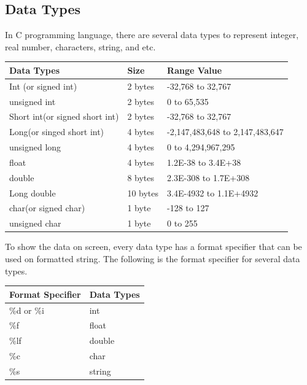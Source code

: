 \subsection{Data Types}
In C programming language, there are several data types to represent integer, real number, characters, string, and etc.
\begin{center}
	\begin{tabular}{|l|l|l|}
		\hline
		Data Types                       & Size   & Range Value                              \\ \hline
		Int (or signed int)            & 2 bytes  & -32,768 to 32,767                          \\ \hline
		unsigned int                   & 2 bytes  & 0 to 65,535                                \\ \hline
		Short int(or signed short int) & 2 bytes  & -32,768 to 32,767                          \\ \hline
		Long(or singed short int)      & 4 bytes  & -2,147,483,648 to 2,147,483,647            \\ \hline
		unsigned long                  & 4 bytes  & 0 to 4,294,967,295                         \\ \hline
		float                          & 4 bytes  & 1.2E-38 to 3.4E+38     						\\ \hline
		double                         & 8 bytes  & 2.3E-308 to 1.7E+308    					\\ \hline
		Long double                    & 10 bytes & 3.4E-4932 to 1.1E+4932 						 \\ \hline
		char(or signed char)           & 1 byte   & -128 to 127                                \\ \hline
		unsigned char                  & 1 byte   & 0 to 255                                   \\ \hline
	\end{tabular}
\end{center}
To show the data on screen, every data type has a format specifier that can be used on formatted string. The following is the format specifier for several data types.
\begin{center}
	\begin{tabular}{|l|l|}
		\hline
		Format Specifier & Data Types   \\ \hline
		\%d or \%i       & int          \\ \hline
		\%f              & float        \\ \hline
		\%lf             & double       \\ \hline
		\%c              & char         \\ \hline
		\%s              & string \\ \hline
	\end{tabular}
\end{center}
